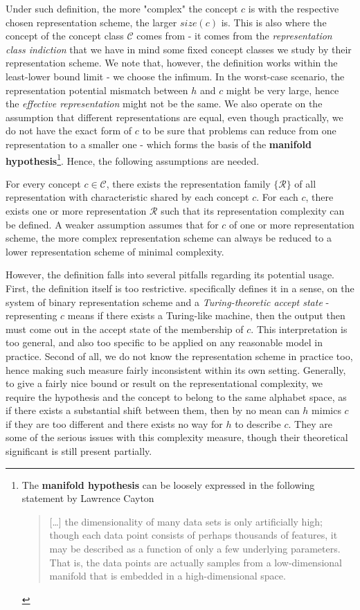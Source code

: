 Under such definition, the more "complex" the concept $c$ is with the respective chosen representation scheme, the larger $size(c)$ is. This is also where the concept of the concept class $\mathcal{C}$ comes from - it comes from the \textit{representation class indiction} that we have in mind some fixed concept classes we study by their representation scheme. We note that, however, the definition works within the least-lower bound limit - we choose the infimum. In the worst-case scenario, the representation potential mismatch between $h$ and $c$ might be very large, hence the \textit{effective representation} might not be the same. We also operate on the assumption that different representations are equal, even though practically, we do not have the exact form of $c$ to be sure that problems can reduce from one representation to a smaller one - which forms the basis of the \textbf{manifold hypothesis}\footnote{The \textbf{manifold hypothesis} can be loosely expressed in the following statement by Lawrence Cayton \begin{quote}
  [\dots] the dimensionality of many data sets is only artificially high; though each data point consists of perhaps thousands of features, it may be described as a function of only a few underlying parameters. That is, the data points are actually samples from a low-dimensional manifold that is embedded in a high-dimensional space. 
\end{quote}}. Hence, the following assumptions are needed. 

\begin{assumption}
    For every concept $c\in\mathcal{C}$, there exists the representation family $\{\mathcal{R}\}$ of all representation with characteristic shared by each concept $c$. For each $c$, there exists one or more representation $\mathcal{R}$ such that its representation complexity can be defined. A weaker assumption assumes that for $c$ of one or more representation scheme, the more complex representation scheme can always be reduced to a lower representation scheme of minimal complexity.
\end{assumption}

However, the definition falls into several pitfalls regarding its potential usage. First, the definition itself is too restrictive. \cite{10.5555/200548} specifically defines it in a sense, on the system of binary representation scheme and a \textit{Turing-theoretic accept state} - representing $c$ means if there exists a Turing-like machine, then the output then must come out in the accept state of the membership of $c$. This interpretation is too general, and also too specific to be applied on any reasonable model in practice. Second of all, we do not know the representation scheme in practice too, hence making such measure fairly inconsistent within its own setting. Generally, to give a fairly nice bound or result on the representational complexity, we require the hypothesis and the concept to belong to the same alphabet space, as if there exists a substantial shift between them, then by no mean can $h$ mimics $c$ if they are too different and there exists no way for $h$ to describe $c$. They are some of the serious issues with this complexity measure, though their theoretical significant is still present partially. 

